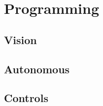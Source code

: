 \newpage
\section{Programming}


\newpage
\subsection{Vision}


\newpage
\subsection{Autonomous}


\newpage
\subsection{Controls}




\newpage
\printbibliography

